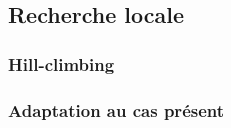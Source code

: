 
\subsection{Recherche locale}



\subsubsection{Hill-climbing}
\subsubsection{Adaptation au cas présent}
